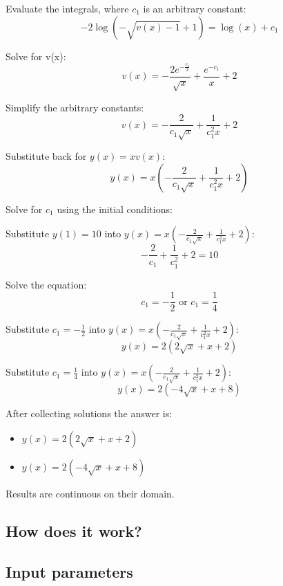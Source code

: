 \documentclass[12pt,letterpaper]{article}
\begin{document}
Evaluate the integrals, where $c_1$ is an arbitrary constant:
\begin{equation}
     -2\log (-\sqrt{v(x) - 1} + 1) = \log (x) + c_1
\end{equation}

Solve for v(x):
\begin{equation}
     v(x) = - \frac{2e^{-\frac{c_1}{2}}}{\sqrt{x}} + \frac{e^{-c_1}}{x} + 2
\end{equation}

Simplify the arbitrary constants:
\begin{equation}
     v(x) = - \frac{2}{c_1\sqrt{x}} + \frac{1}{c_1^2x} + 2
\end{equation}

Substitute back for $y(x) = x v(x)$:
\begin{equation}
     y(x) = x(- \frac{2}{c_1\sqrt{x}} + \frac{1}{c_1^2x} + 2)
\end{equation}

Solve for $c_1$ using the initial conditions:

Substitute $y(1) = 10$ into $y(x) = x(- \frac{2}{c_1\sqrt{x}} + \frac{1}{c_1^2x} + 2)$:
\begin{equation}
     -\frac{2}{c_1} + \frac{1}{c_1^2} + 2 = 10
\end{equation}

Solve the equation:
\begin{equation}
     c_1 = -\frac{1}{2} \text{ or } c_1 = \frac{1}{4}
\end{equation}

Substitute $c_1 = -\frac{1}{2}$ into $y(x) = x(- \frac{2}{c_1\sqrt{x}} + \frac{1}{c_1^2x} + 2)$:
\begin{equation}
     y(x) = 2 (2 \sqrt{x} + x + 2)
\end{equation}

Substitute $c_1 = \frac{1}{4}$ into $y(x) = x(- \frac{2}{c_1\sqrt{x}} + \frac{1}{c_1^2x} + 2)$:
\begin{equation}
     y(x) = 2 (-4 \sqrt{x} + x + 8)
\end{equation}

After collecting solutions the answer is:
\begin{itemize}
    \item
         $y(x) = 2 (2 \sqrt{x} + x + 2)$
    \item
         $y(x) = 2 (-4 \sqrt{x} + x + 8)$
\end{itemize}
Results are continuous on their domain.

\begin{center}
    \section*{How does it work?}
    \subsection*{Input parameters}
\end{center}
\end{document}
